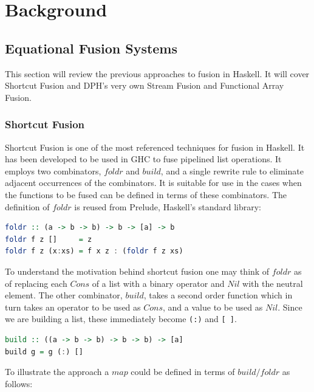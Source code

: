\documentclass[preamble.tex]{subfiles}
\begin{document}
\clearpage


\chapter{Background}


\section{Equational Fusion Systems}

This section will review the previous approaches to fusion in Haskell. It will cover Shortcut Fusion and DPH's very own Stream Fusion and Functional Array Fusion.


\subsection{Shortcut Fusion}

Shortcut Fusion \cite{GLP93} is one of the most referenced techniques for fusion in Haskell. It has been developed to be used in GHC to fuse pipelined list operations. It employs two combinators, $foldr$ and $build$, and a single rewrite rule to eliminate adjacent occurrences of the combinators. It is suitable for use in the cases when the functions to be fused can be defined in terms of these combinators. $ $The definition of $foldr$ is reused from Prelude, Haskell's standard library:

\begin{lstlisting}[basicstyle={\ttfamily},language=Haskell]
foldr :: (a -> b -> b) -> b -> [a] -> b
foldr f z []     = z
foldr f z (x:xs) = f x z : (foldr f z xs)
\end{lstlisting}


To understand the motivation behind shortcut fusion one may think of $foldr$ as of replacing each $Cons$ of a list with a binary operator and $Nil$ with the neutral element. The other combinator, $build$, takes a second order function which in turn takes an operator to be used as $Cons$, and a value to be used as $Nil$. Since we are building a list, these immediately become \texttt{(:)} and \texttt{{[} {]}}.

\begin{lstlisting}[basicstyle={\ttfamily},language=Haskell]
build :: ((a -> b -> b) -> b -> b) -> [a]
build g = g (:) []
\end{lstlisting}


To illustrate the approach a $map$ could be defined in terms of $build/foldr$ as follows:
\end{document}
